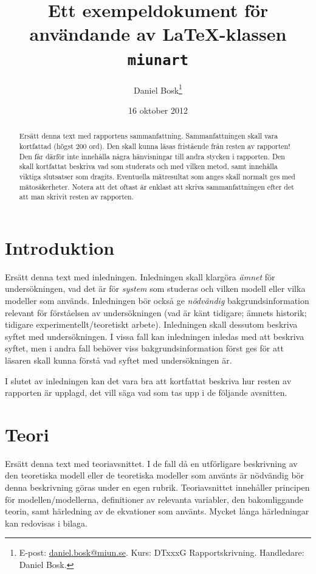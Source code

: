 \documentclass[a4paper,nologo]{miunart} %
\title{Ett exempeldokument för användande av \LaTeX-klassen \texttt{miunart}}
\author{Daniel Bosk\footnote{%
	E-post: \href{mailto:daniel.bosk@miun.se}{daniel.bosk@miun.se}.
	Kurs: DTxxxG Rapportskrivning.
	Handledare: Daniel Bosk.
}}
\date{16 oktober 2012}
\begin{document}
\maketitle
\begin{abstract}
  Ersätt denna text med rapportens sammanfattning.
	Sammanfattningen skall vara kortfattad (högst 200 ord).
	Den skall kunna läsas fristående från resten av rapporten!
	Den får därför inte innehålla några hänvisningar till andra stycken 
	i rapporten.
	Den skall kortfattat beskriva vad som studerats och med vilken metod, samt 
	innehålla viktiga slutsatser som dragits.
	Eventuella mätresultat som anges skall normalt ges med mätosäkerheter.
	Notera att det oftast är enklast att skriva sammanfattningen efter det att 
	man skrivit resten av rapporten.

\end{abstract}


\section{Introduktion}
\label{sec:intro}
Ersätt denna text med inledningen.
Inledningen skall klargöra \emph{ämnet} för undersökningen, vad det är för 
\emph{system} som studeras och vilken modell eller vilka modeller som används.
Inledningen bör också ge \emph{nödvändig} bakgrundsinformation relevant för 
förståelsen av undersökningen (vad är känt tidigare; ämnets historik; tidigare 
experimentellt/teoretiskt arbete).
Inledningen skall dessutom beskriva syftet med undersökningen.
I vissa fall kan inledningen inledas med att beskriva syftet, men i andra fall 
behöver viss bakgrundsinformation först ges för att läsaren skall kunna förstå 
vad syftet med undersökningen är.

I slutet av inledningen kan det vara bra att kortfattat beskriva hur resten av 
rapporten är upplagd, det vill säga vad som tas upp i de följande avsnitten.


\section{Teori}
\label{sec:theory}
Ersätt denna text med teoriavsnittet.
I de fall då en utförligare beskrivning av den teoretiska modell eller de 
teoretiska modeller som använts är nödvändig bör denna beskrivning göras under 
en egen rubrik.
Teoriavsnittet innehåller principen för modellen/modellerna, definitioner av 
relevanta variabler, den bakomliggande teorin, samt härledning av de ekvationer 
som använts.
Mycket långa härledningar kan redovisas i bilaga.
\end{document}

